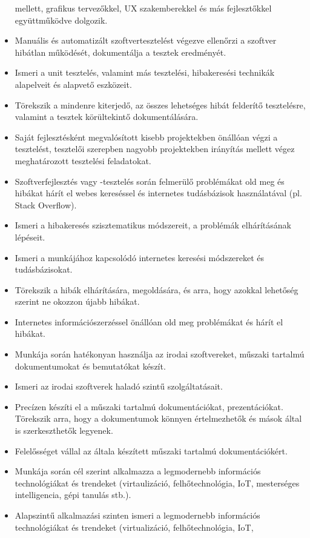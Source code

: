 \begin{itemize}
  mellett, grafikus tervezőkkel, UX szakemberekkel és más fejlesztőkkel
  együttműködve dolgozik.
\item
  Manuális és automatizált szoftvertesztelést végezve ellenőrzi a
  szoftver hibátlan működését, dokumentálja a tesztek eredményét.
\item
  Ismeri a unit tesztelés, valamint más tesztelési, hibakeresési
  technikák alapelveit és alapvető eszközeit.
\item
  Törekszik a mindenre kiterjedő, az összes lehetséges hibát felderítő
  tesztelésre, valamint a tesztek körültekintő dokumentálására.
\item
  Saját fejlesztésként megvalósított kisebb projektekben önállóan végzi
  a tesztelést, tesztelői szerepben nagyobb projektekben irányítás
  mellett végez meghatározott tesztelési feladatokat.
\item
  Szoftverfejlesztés vagy -tesztelés során felmerülő problémákat old meg
  és hibákat hárít el webes kereséssel és internetes tudásbázisok
  használatával (pl. Stack Overflow).
\item
  Ismeri a hibakeresés szisztematikus módszereit, a problémák
  elhárításának lépéseit.
\item
  Ismeri a munkájához kapcsolódó internetes keresési módszereket és
  tudásbázisokat.
\item
  Törekszik a hibák elhárítására, megoldására, és arra, hogy azokkal
  lehetőség szerint ne okozzon újabb hibákat.
\item
  Internetes információszerzéssel önállóan old meg problémákat és hárít
  el hibákat.
\item
  Munkája során hatékonyan használja az irodai szoftvereket, műszaki
  tartalmú dokumentumokat és bemutatókat készít.
\item
  Ismeri az irodai szoftverek haladó szintű szolgáltatásait.
\item
  Precízen készíti el a műszaki tartalmú dokumentációkat,
  prezentációkat. Törekszik arra, hogy a dokumentumok könnyen
  értelmezhetők és mások által is szerkeszthetők legyenek.
\item
  Felelősséget vállal az általa készített műszaki tartalmú
  dokumentációkért.
\item
  Munkája során cél szerint alkalmazza a legmodernebb információs
  technológiákat és trendeket (virtaulizáció, felhőtechnológia, IoT,
  mesterséges intelligencia, gépi tanulás stb.).
\item
  Alapszintű alkalmazási szinten ismeri a legmodernebb információs
  technológiákat és trendeket (virtualizáció, felhőtechnológia, IoT,

\end{itemize}
